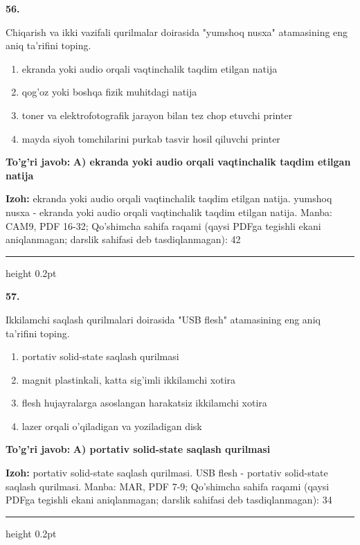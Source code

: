 \documentclass[10pt,a4paper]{article}
\begin{document}
{\bfseries\sffamily\color{ink} 56.}
\par
Chiqarish va ikki vazifali qurilmalar doirasida "yumshoq nusxa" atamasining eng aniq ta'rifini toping.
\begin{enumerate}[label=\Alph*),leftmargin=9mm]
\item ekranda yoki audio orqali vaqtinchalik taqdim etilgan natija
\item qog'oz yoki boshqa fizik muhitdagi natija
\item toner va elektrofotografik jarayon bilan tez chop etuvchi printer
\item mayda siyoh tomchilarini purkab tasvir hosil qiluvchi printer
\end{enumerate}
\begin{tcolorbox}[enhanced,breakable,colback=teal!4,colframe=teal!60!black,boxrule=0.45pt,arc=1.2mm,left=2.7mm,right=2.7mm,top=1.8mm,bottom=1.8mm,before skip=2mm,after skip=2mm]
{\bfseries\sffamily\color{teal}To'g'ri javob:} \textbf{A) ekranda yoki audio orqali vaqtinchalik taqdim etilgan natija}
\par\smallskip
{\bfseries Izoh:} ekranda yoki audio orqali vaqtinchalik taqdim etilgan natija. yumshoq nusxa - ekranda yoki audio orqali vaqtinchalik taqdim etilgan natija. Manba: CAM9, PDF 16-32; Qo'shimcha sahifa raqami (qaysi PDFga tegishli ekani aniqlanmagan; darslik sahifasi deb tasdiqlanmagan): 42
\end{tcolorbox}
\vspace{2mm}\hrule height 0.2pt\vspace{3mm}

{\bfseries\sffamily\color{ink} 57.}
\par
Ikkilamchi saqlash qurilmalari doirasida "USB flesh" atamasining eng aniq ta'rifini toping.
\begin{enumerate}[label=\Alph*),leftmargin=9mm]
\item portativ solid-state saqlash qurilmasi
\item magnit plastinkali, katta sig'imli ikkilamchi xotira
\item flesh hujayralarga asoslangan harakatsiz ikkilamchi xotira
\item lazer orqali o'qiladigan va yoziladigan disk
\end{enumerate}
\begin{tcolorbox}[enhanced,breakable,colback=teal!4,colframe=teal!60!black,boxrule=0.45pt,arc=1.2mm,left=2.7mm,right=2.7mm,top=1.8mm,bottom=1.8mm,before skip=2mm,after skip=2mm]
{\bfseries\sffamily\color{teal}To'g'ri javob:} \textbf{A) portativ solid-state saqlash qurilmasi}
\par\smallskip
{\bfseries Izoh:} portativ solid-state saqlash qurilmasi. USB flesh - portativ solid-state saqlash qurilmasi. Manba: MAR, PDF 7-9; Qo'shimcha sahifa raqami (qaysi PDFga tegishli ekani aniqlanmagan; darslik sahifasi deb tasdiqlanmagan): 34
\end{tcolorbox}
\vspace{2mm}\hrule height 0.2pt\vspace{3mm}
\end{document}
